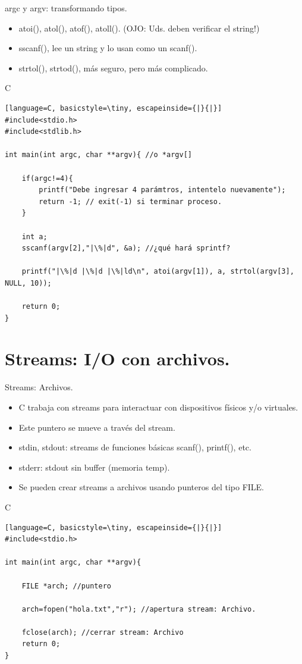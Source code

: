\documentclass{beamer}
\begin{document}
\begin{frame}[fragile]{argc y argv: transformando tipos.}
\begin{itemize}
	\item atoi(), atol(), atof(), atoll(). (OJO: Uds. deben verificar el string!)
	\item sscanf(), lee un string y lo usan como un scanf().
	\item strtol(), strtod(), más seguro, pero más complicado.
\end{itemize}

\begin{exampleblock}{C}
\begin{lstlisting}[language=C, basicstyle=\tiny, escapeinside={|}{|}]
#include<stdio.h>
#include<stdlib.h>

int main(int argc, char **argv){ //o *argv[]

	if(argc!=4){
		printf("Debe ingresar 4 parámtros, intentelo nuevamente");
		return -1; // exit(-1) si terminar proceso.
	}

	int a;
	sscanf(argv[2],"|\%|d", &a); //¿qué hará sprintf?

	printf("|\%|d |\%|d |\%|ld\n", atoi(argv[1]), a, strtol(argv[3], NULL, 10));

	return 0;
}
\end{lstlisting}
\end{exampleblock}
\end{frame}

\section{Streams: I/O con archivos.}
\begin{frame}[fragile]{Streams: Archivos.}
\begin{itemize}
	\item C trabaja con streams para interactuar con dispositivos físicos y/o virtuales.
	\item Este puntero se mueve a través del stream. 
	\item stdin, stdout: streams de funciones básicas scanf(), printf(), etc.
	\item stderr: stdout sin buffer (memoria temp).
	\item Se pueden crear streams a archivos usando punteros del tipo FILE.
\end{itemize}
\begin{exampleblock}{C}
\begin{lstlisting}[language=C, basicstyle=\tiny, escapeinside={|}{|}]
#include<stdio.h>

int main(int argc, char **argv){

	FILE *arch; //puntero

	arch=fopen("hola.txt","r"); //apertura stream: Archivo.

	fclose(arch); //cerrar stream: Archivo
	return 0;
}
\end{lstlisting}
\end{exampleblock}
\end{frame}
\end{document}
